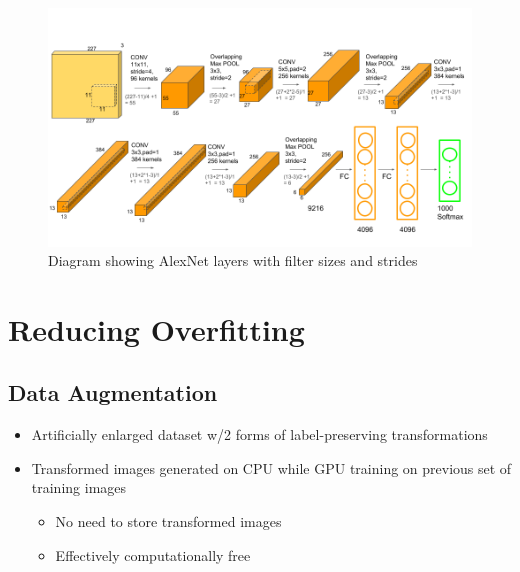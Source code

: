 \documentclass[a4paper,12pt]{article}
\begin{document}
\begin{figure}[htp]
  \centering
  \includegraphics[width=140mm, scale=0.75]{images/AlexNet-1.png}
  \caption{Diagram showing AlexNet layers with filter sizes and strides}
  \label{AlexNet-Layers}
\end{figure}

\pagebreak

\section{Reducing Overfitting}
\subsection{Data Augmentation}
\begin{itemize}
  \item Artificially enlarged dataset w/2 forms of label-preserving transformations
  \item Transformed images generated on CPU while GPU training on previous set of training images
  \begin{itemize}
    \item No need to store transformed images
    \item Effectively computationally free
  \end{itemize}
\end{itemize}
\end{document}
